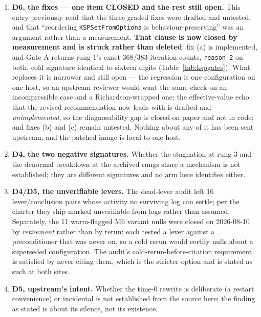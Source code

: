 \documentclass[11pt,a4paper]{article}
\begin{document}
\begin{enumerate}
build never assembles --- so it refutes a discriminator without certifying the operator.
\item \textbf{D6, the fixes --- one item CLOSED and the rest still open.} This entry previously
read that the three graded fixes were drafted and untested, and that ``reordering
\texttt{KSPSetFromOptions} is behaviour-preserving'' was an argument rather than a measurement.
\textbf{That clause is now closed by measurement and is struck rather than deleted}: fix (a) is
implemented, and Gate A returns rung 1's exact 368/383 iteration counts, \texttt{reason 2} on
both, cold signature identical to sixteen digits (Table~\ref{tab:kspgates}). What replaces it is
narrower and still open --- the regression is one configuration on one host, so an upstream
reviewer would want the same check on an incompressible case and a Richardson-wrapped one;
the effective-value echo that the revised recommendation now leads with is drafted and
\emph{unimplemented}, so the diagnosability gap is closed on paper and not in code; and fixes (b)
and (c) remain untested. Nothing about any of it has been sent upstream, and the patched image is
local to one host.
\item \textbf{D4, the two negative signatures.} Whether the stagnation at rung 3 and the
denormal breakdown at the archived rungs share a mechanism is not established; they are
different signatures and no arm here identifies either.
\item \textbf{D4/D5, the unverifiable levers.} The dead-lever audit left 16 lever/conclusion
pairs whose activity no surviving log can settle; per the charter they ship marked
unverifiable-from-logs rather than assumed. Separately, the 11 warm-flagged M6 variant nulls
were closed on 2026-08-10 by \emph{retirement} rather than by rerun: each tested a lever
against a preconditioner that was never on, so a cold rerun would certify nulls about a
superseded configuration. The audit's cold-rerun-before-citation requirement is satisfied by
never citing them, which is the stricter option and is stated as such at both sites.
\item \textbf{D5, upstream's intent.} Whether the time-0 rewrite is deliberate (a restart
convenience) or incidental is not established from the source here; the finding as stated is
about its silence, not its existence.
\end{enumerate}
\end{document}

